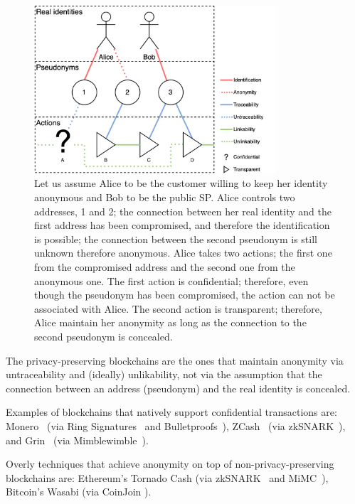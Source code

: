 \documentclass{ieeeaccess}
\begin{document}
\begin{figure}[h!]
\includegraphics[width=9cm]{anonymity-diagram.png}
\centering
\caption{Let us assume Alice to be the customer willing to keep her identity anonymous and Bob to be the public SP. Alice controls two addresses, 1 and 2; the connection between her real identity and the first address has been compromised, and therefore the identification is possible; the connection between the second pseudonym is still unknown therefore anonymous. Alice takes two actions; the first one from the compromised address and the second one from the anonymous one. The first action is confidential; therefore, even though the pseudonym has been compromised, the action can not be associated with Alice. The second action is transparent; therefore, Alice maintain her anonymity as long as the connection to the second pseudonym is concealed.}

\label{fig:anonymity-diagram1}
\end{figure}

The privacy-preserving blockchains are the ones that maintain anonymity via untraceability and (ideally) unlikability, not via the assumption that the connection between an address (pseudonym) and the real identity is concealed.   

Examples of blockchains that natively support confidential transactions are: Monero~\cite{van2013cryptonote} (via Ring Signatures~\cite{cryptoeprint:2015:1098} and Bulletproofs~\cite{Bulletpr14, bunz2018bulletproofs}), ZCash~\cite{sasson2014zerocash} (via zkSNARK~\cite{ben2013snarks}), and Grin~\cite{fuchsbauer2019aggregate} (via Mimblewimble~\cite{httpsdow19}).

Overly techniques that achieve anonymity on top of non-privacy-preserving blockchains are: Ethereum's Tornado Cash\cite{pertsev2019tornado} (via zkSNARK~\cite{groth2016size} and MiMC~\cite{albrecht2016mimc}), Bitcoin's Wasabi\cite{WasabiWa56} (via CoinJoin \cite{CoinJoin41}).
\end{document}
